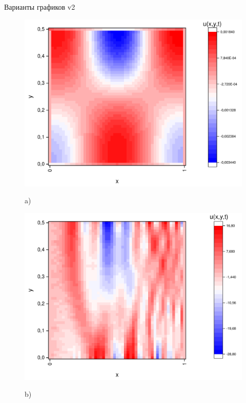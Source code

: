\documentclass[a4paper,12pt]{article}
\begin{document}
Варианты графиков v2
\begin{figure}[h!]
	\begin{center}
		\begin{minipage}[h]{0.23\linewidth}
			\includegraphics[width=\textwidth]{graphs/graphs_l/v2/wave_t-0_v2.pdf} \begin{center}	a)	\end{center}
		\end{minipage}
		\begin{minipage}[h]{0.23\linewidth}
			\includegraphics[width=\textwidth]{graphs/graphs_l/v2/wave_t-8_v2.pdf} \begin{center}	b)	\end{center}

\end{minipage}
\end{center}
\end{figure}
\end{document}
